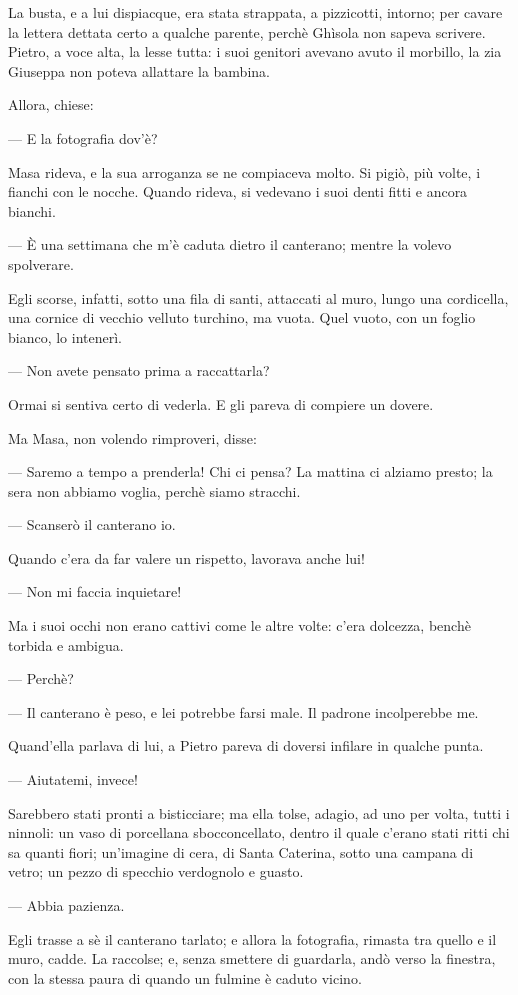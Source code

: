 La busta, e a lui dispiacque, era stata strappata, a pizzicotti, intorno; per cavare la lettera dettata certo a qualche parente, perchè Ghìsola non sapeva scrivere. Pietro, a voce alta, la lesse tutta: i suoi genitori avevano avuto il morbillo, la zia Giuseppa non poteva allattare la bambina.

Allora, chiese:

— E la fotografia dov'è?

Masa rideva, e la sua arroganza se ne compiaceva molto. Si pigiò, più volte, i fianchi con le nocche. Quando rideva, si vedevano i suoi denti fitti e ancora bianchi.

— È una settimana che m'è caduta dietro il canterano; mentre la volevo spolverare.

Egli scorse, infatti, sotto una fila di santi, attaccati al muro, lungo una cordicella, una cornice di vecchio velluto turchino, ma vuota. Quel vuoto, con un foglio bianco, lo intenerì.

— Non avete pensato prima a raccattarla?

Ormai si sentiva certo di vederla. E gli pareva di compiere un dovere.

Ma Masa, non volendo rimproveri, disse:

— Saremo a tempo a prenderla! Chi ci pensa? La mattina ci alziamo presto; la sera non abbiamo voglia, perchè siamo stracchi.

— Scanserò il canterano io.

Quando c'era da far valere un rispetto, lavorava anche lui!

— Non mi faccia inquietare!

Ma i suoi occhi non erano cattivi come le altre volte: c'era dolcezza, benchè torbida e ambigua.

— Perchè?

— Il canterano è peso, e lei potrebbe farsi male. Il padrone incolperebbe me.

Quand'ella parlava di lui, a Pietro pareva di doversi infilare in qualche punta.

— Aiutatemi, invece!

Sarebbero stati pronti a bisticciare; ma ella tolse, adagio, ad uno per volta, tutti i ninnoli: un vaso di porcellana sbocconcellato, dentro il quale c'erano stati ritti chi sa quanti fiori; un'imagine di cera, di Santa Caterina, sotto una campana di vetro; un pezzo di specchio verdognolo e guasto.

— Abbia pazienza.

Egli trasse a sè il canterano tarlato; e allora la fotografia, rimasta tra quello e il muro, cadde. La raccolse; e, senza smettere di guardarla, andò verso la finestra, con la stessa paura di quando un fulmine è caduto vicino.

